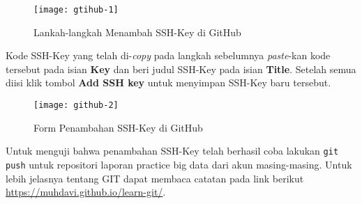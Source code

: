 \documentclass[a4paper]{tufte-handout}
\begin{document}
\begin{enumerate}
\begin{figure}[!ht]
\centering
\texttt{[image: gtihub-1]}
\caption{Lankah-langkah Menambah SSH-Key di GitHub}
\label{gam:langkah-ssh}
\end{figure}

Kode SSH-Key yang telah di-\textit{copy} pada langkah sebelumnya \textit{paste}-kan kode tersebut pada isian \textbf{Key} dan beri judul SSH-Key pada isian \textbf{Title}. Setelah semua diisi klik tombol \textbf{Add SSH key} untuk menyimpan SSH-Key baru tersebut.

\begin{figure}[!ht]
\centering
\texttt{[image: github-2]}
\caption{Form Penambahan SSH-Key di GitHub}
\label{gam:tambah-ssh}
\end{figure}

Untuk menguji bahwa penambahan SSH-Key telah berhasil coba lakukan {\tt git push} untuk repositori laporan practice big data dari akun masing-masing. Untuk lebih jelasnya tentang GIT dapat membaca catatan pada link berikut \url{https://muhdavi.github.io/learn-git/}.
\end{enumerate}
\end{document}
